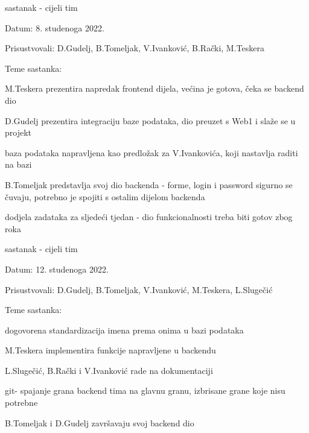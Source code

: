 \begin{packed_enum}
			\item  sastanak - cijeli tim
			\item[] \begin{packed_item}
				\item Datum: 8. studenoga 2022.
				\item Prisustvovali: D.Gudelj, B.Tomeljak, V.Ivanković, B.Rački, M.Teskera
				\item Teme sastanka:
				\begin{packed_item}
					\item M.Teskera prezentira napredak frontend dijela, većina je gotova, čeka se backend dio
					\item D.Gudelj prezentira integraciju baze podataka, dio preuzet s Web1 i slaže se u projekt
					\item baza podataka napravljena kao predložak za V.Ivankovića, koji nastavlja raditi na bazi
					\item B.Tomeljak predstavlja svoj dio backenda - forme, login i password sigurno se čuvaju, potrebno je spojiti s ostalim dijelom backenda
					\item dodjela zadataka za sljedeći tjedan - dio funkcionalnosti treba biti gotov zbog roka
				\end{packed_item}
			\end{packed_item}
			
			
			\item  sastanak - cijeli tim
			\item[] \begin{packed_item}
				\item Datum: 12. studenoga 2022.
				\item Prisustvovali: D.Gudelj, B.Tomeljak, V.Ivanković, M.Teskera, L.Slugečić
				\item Teme sastanka:
				\begin{packed_item}
					\item dogovorena standardizacija imena prema onima u bazi podataka
					\item M.Teskera implementira funkcije napravljene u backendu
					\item L.Slugečić, B.Rački i V.Ivanković rade na dokumentaciji
					\item git- spajanje grana backend tima na glavnu granu, izbrisane grane koje nisu potrebne
					\item B.Tomeljak i D.Gudelj završavaju svoj backend dio
				\end{packed_item}
			\end{packed_item}
			
			
		\end{packed_enum}
		
